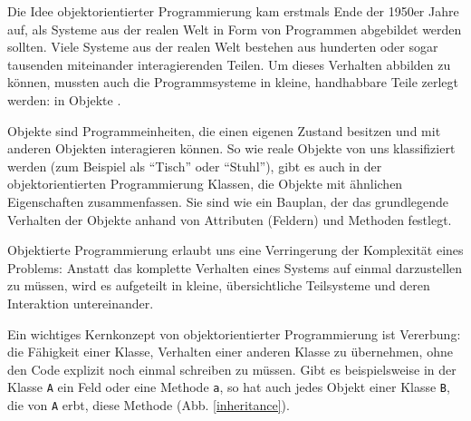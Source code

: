 Die Idee objektorientierter Programmierung kam erstmals Ende der 1950er Jahre auf, als Systeme aus der realen Welt in Form von Programmen abgebildet werden sollten. Viele Systeme aus der realen Welt bestehen aus hunderten oder sogar tausenden miteinander interagierenden Teilen. Um dieses Verhalten abbilden zu können, mussten auch die Programmsysteme in kleine, handhabbare Teile zerlegt werden: in Objekte \cite{history}.

Objekte sind Programmeinheiten, die einen eigenen Zustand besitzen und mit anderen Objekten interagieren können. So wie reale Objekte von uns klassifiziert werden (zum Beispiel als ``Tisch'' oder ``Stuhl''), gibt es auch in der objektorientierten Programmierung Klassen, die Objekte mit ähnlichen Eigenschaften zusammenfassen. Sie sind wie ein Bauplan, der das grundlegende Verhalten der Objekte anhand von Attributen (Feldern) und Methoden festlegt.

Objektierte Programmierung erlaubt uns eine Verringerung der Komplexität eines Problems: Anstatt das komplette Verhalten eines Systems auf einmal darzustellen zu müssen, wird es aufgeteilt in kleine, übersichtliche Teilsysteme und deren Interaktion untereinander.

Ein wichtiges Kernkonzept von objektorientierter Programmierung ist Vererbung: die Fähigkeit einer Klasse, Verhalten einer anderen Klasse zu übernehmen, ohne den Code explizit noch einmal schreiben zu müssen. Gibt es beispielsweise in der Klasse \texttt{A} ein Feld oder eine Methode \texttt{a}, so hat auch jedes Objekt einer Klasse \texttt{B}, die von \texttt{A} erbt, diese Methode (Abb. \ref{inheritance}).

